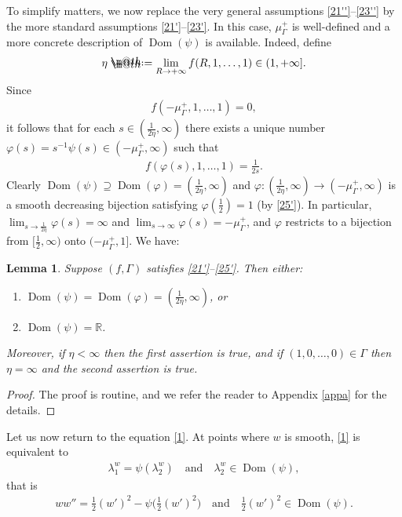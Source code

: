 \documentclass[12pt]{article}
\makeatletter
\numberwithin{equation}{section}
\theoremstyle{plain}
\newtheorem{lem}[thm]{Lemma}
\theoremstyle{definition}
\renewcommand{\phi}{\varphi}
\newcommand*{\defeq}{\mathrel{\rlap{%
			\raisebox{0.3ex}{$\m@th\cdot$}}%
		\raisebox{-0.3ex}{$\m@th\cdot$}}%
	=}
\makeatother
\begin{document}
To simplify matters, we now replace the very general assumptions \eqref{21''}--\eqref{23''} by the more standard assumptions \eqref{21'}--\eqref{23'}. In this case, $\mu_\Gamma^+$ is well-defined and a more concrete description of $\operatorname{Dom}(\psi)$ is available. Indeed, define
\begin{align}\label{139}
\eta \defeq \lim_{R\rightarrow+\infty} f(R,1,\dots,1)\in(1,+\infty].
\end{align}
Since
\begin{align*}
f(-\mu_\Gamma^+, 1,\dots,1) = 0,
\end{align*} 
it follows that for each $s\in(\frac{1}{2\eta},\infty)$ there exists a unique number $\phi(s) =s^{-1}\psi(s) \in(-\mu_\Gamma^+, \infty)$ such that 
\begin{align*}
f(\phi(s),1,\dots,1) = \frac{1}{2s}.
\end{align*}
Clearly $\operatorname{Dom}(\psi) \supseteq \operatorname{Dom}(\phi) = (\frac{1}{2\eta},\infty)$ and $\phi:(\frac{1}{2\eta},\infty)\rightarrow (-\mu_\Gamma^+, \infty)$ is a smooth decreasing bijection satisfying $\phi(\frac{1}{2})=1$ (by \eqref{25'}). In particular, $\lim_{s\rightarrow\frac{1}{2\eta}}\phi(s) = \infty$ and $\lim_{s\rightarrow\infty}\phi(s) = -\mu_\Gamma^+$, and $\phi$ restricts to a bijection from $[\frac{1}{2},\infty)$ onto $(-\mu_\Gamma^+, 1]$. We have: 

\begin{lem}\label{140}
	Suppose $(f,\Gamma)$ satisfies \eqref{21'}--\eqref{25'}. Then either: \smallskip
	\begin{enumerate}
		\item $\operatorname{Dom}(\psi) = \operatorname{Dom}(\phi) = (\frac{1}{2\eta},\infty)$, or\smallskip
		\item $\operatorname{Dom}(\psi) = \mathbb{R}$.\smallskip
	\end{enumerate}
Moreover, if $\eta<\infty$ then the first assertion is true, and if $(1,0,\dots,0)\in\Gamma$ then $\eta = \infty$ and the second assertion is true. 
\end{lem}

\begin{proof}
	The proof is routine, and we refer the reader to Appendix \ref{appa} for the details.
\end{proof}



Let us now return to the equation \eqref{1}. At points where $w$ is smooth, \eqref{1} is equivalent to 
\begin{align}\label{2'}
\lambda_1^w = \psi(\lambda_2^w) \quad \text{and} \quad  \lambda_2^w \in \operatorname{Dom}(\psi),
\end{align}
that is
\begin{align}\label{2}
ww'' = \frac{1}{2}(w')^2 - \psi\Big(\frac{1}{2}(w')^2\Big)\quad \text{and} \quad \frac{1}{2}(w')^2 \in \operatorname{Dom}(\psi).
\end{align}
\end{document}
